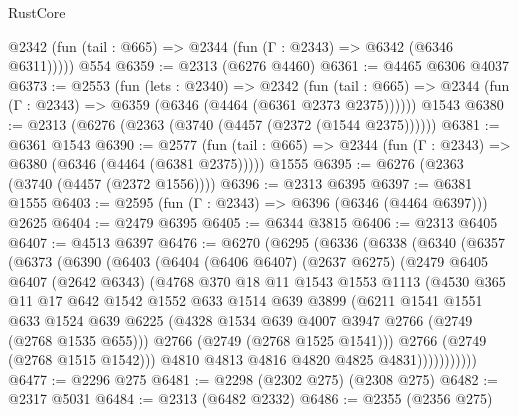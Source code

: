 \begin{lexlean}{RustCore}
\begin{coremodule}
      @2342 (fun (tail : @665) => @2344 (fun (Γ : @2343) => @6342 (@6346 @6311)))))
    @554
@6359 := @2313 (@6276 @4460)
@6361 := @4465 @6306 @4037
@6373 := @2553
    (fun (lets : @2340) =>
    @2342
      (fun (tail : @665) => @2344 (fun (Γ : @2343) => @6359 (@6346 (@4464 (@6361 @2373 @2375))))))
    @1543
@6380 := @2313 (@6276 (@2363 (@3740 (@4457 (@2372 (@1544 @2375))))))
@6381 := @6361 @1543
@6390 := @2577
    (fun (tail : @665) => @2344 (fun (Γ : @2343) => @6380 (@6346 (@4464 (@6381 @2375)))))
    @1555
@6395 := @6276 (@2363 (@3740 (@4457 (@2372 @1556))))
@6396 := @2313 @6395
@6397 := @6381 @1555
@6403 := @2595 (fun (Γ : @2343) => @6396 (@6346 (@4464 @6397))) @2625
@6404 := @2479 @6395
@6405 := @6344 @3815
@6406 := @2313 @6405
@6407 := @4513 @6397
@6476 := @6270
    (@6295
      (@6336
        (@6338
          (@6340
            (@6357
              (@6373
                (@6390
                  (@6403
                    (@6404
                      (@6406 @6407)
                      (@2637 @6275)
                      (@2479
                        @6405
                        @6407
                        (@2642 @6343)
                        (@4768
                          @370
                          @18
                          @11
                          @1543
                          @1553
                          @1113
                          (@4530
                            @365
                            @11
                            @17
                            @642
                            @1542
                            @1552
                            @633
                            @1514
                            @639
                            @3899
                            (@6211
                              @1541
                              @1551
                              @633
                              @1524
                              @639
                              @6225
                              (@4328 @1534 @639 @4007 @3947 @2766 (@2749 (@2768 @1535 @655)))
                              @2766
                              (@2749 (@2768 @1525 @1541)))
                            @2766
                            (@2749 (@2768 @1515 @1542)))
                          @4810
                          @4813
                          @4816
                          @4820
                          @4825
                          @4831)))))))))))
@6477 := @2296 @275
@6481 := @2298 (@2302 @275) (@2308 @275)
@6482 := @2317 @5031
@6484 := @2313 (@6482 @2332)
@6486 := @2355 (@2356 @275)

\end{coremodule}
\end{lexlean}
